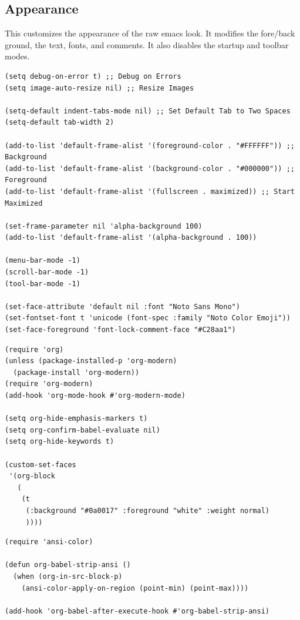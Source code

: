 \documentclass[11pt]{article}
\begin{document}
\subsection{Appearance}
\label{sec:org3b6c8eb}
This customizes the appearance of the raw emacs look.
It modifies the fore/back ground, the text, fonts, and comments.
It also disables the startup and toolbar modes. 
\begin{verbatim}
(setq debug-on-error t) ;; Debug on Errors
(setq image-auto-resize nil) ;; Resize Images

(setq-default indent-tabs-mode nil) ;; Set Default Tab to Two Spaces
(setq-default tab-width 2)

(add-to-list 'default-frame-alist '(foreground-color . "#FFFFFF")) ;; Background
(add-to-list 'default-frame-alist '(background-color . "#000000")) ;; Foreground
(add-to-list 'default-frame-alist '(fullscreen . maximized)) ;; Start Maximized

(set-frame-parameter nil 'alpha-background 100)
(add-to-list 'default-frame-alist '(alpha-background . 100))

(menu-bar-mode -1)
(scroll-bar-mode -1)
(tool-bar-mode -1)

(set-face-attribute 'default nil :font "Noto Sans Mono")
(set-fontset-font t 'unicode (font-spec :family "Noto Color Emoji"))
(set-face-foreground 'font-lock-comment-face "#C28aa1")
\end{verbatim}
\begin{verbatim}
(require 'org)
(unless (package-installed-p 'org-modern)
  (package-install 'org-modern))
(require 'org-modern)
(add-hook 'org-mode-hook #'org-modern-mode)

(setq org-hide-emphasis-markers t)
(setq org-confirm-babel-evaluate nil)
(setq org-hide-keywords t)

(custom-set-faces
 '(org-block
   (
    (t
     (:background "#0a0017" :foreground "white" :weight normal)
     ))))
\end{verbatim}

\begin{verbatim}
(require 'ansi-color)

(defun org-babel-strip-ansi ()
  (when (org-in-src-block-p)
    (ansi-color-apply-on-region (point-min) (point-max))))

(add-hook 'org-babel-after-execute-hook #'org-babel-strip-ansi)
\end{verbatim}
\end{document}
